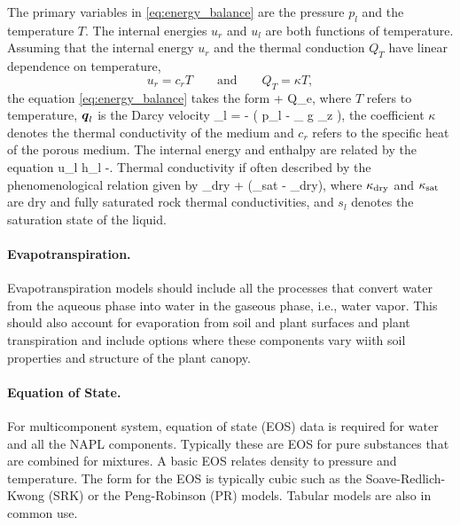 The primary variables in \eqref{eq:energy_balance} are the pressure $p_l$ 
and the temperature $T$. 
The internal energies $u_r$ and $u_l$ are both functions of temperature.  
Assuming that the internal energy $u_r$ and the thermal conduction $Q_T$
have linear dependence on temperature,  
$$
  u_r = c_r T \qquad \text{and}\qquad Q_T=\kappa T,
$$
the equation \eqref{eq:energy_balance} takes the form 
\EQ
  + 
  \boldsymbol{\nabla}\cdot {} 
  \eq 
  Q_e,
\EN
where 
$T$ refers to temperature, 
${\boldsymbol{q}}_l$ is the Darcy velocity 
\EQ
  \bq_l 
  =  
  - 
  \left(
  \boldsymbol{\nabla} p_l 
  -
  \rho _{\alpha} g _z
  \right), 
\EN
the coefficient $\kappa$ denotes the thermal conductivity of the medium and 
$c_r$ refers to the specific heat of the porous medium. 
The internal energy and enthalpy are related by the equation
\EQ
  u_l \eq h_l -.
\EN
Thermal conductivity if often described by the phenomenological relation given by \citet{somerton1974high}
\EQ\label{cond} 
  \kappa \eq \kappa_{\rm dry} +  (\kappa_{\rm sat} - \kappa_{\rm dry}), 
\EN 
where $\kappa_{\rm dry}$ and $\kappa_{\rm sat}$ are dry and fully saturated rock thermal conductivities, 
and $s_l$ denotes the saturation state of the liquid. 

\paragraph{Evapotranspiration. } 
%
Evapotranspiration models should include all the processes that convert water from the aqueous phase into water in the gaseous phase, 
i.e., water vapor.  
This should also account for evaporation from soil and plant surfaces and plant transpiration and include options 
where these components vary wiith soil properties and structure of the plant canopy.

\paragraph{Equation of State.}
%
For multicomponent system, equation of state (EOS) data is required for water and all the NAPL components.  
Typically these are EOS for pure substances that are combined for mixtures.  
A basic EOS relates density to pressure and temperature.  
The form for the EOS is typically cubic such as the Soave-Redlich-Kwong (SRK) or the
Peng-Robinson (PR) models.  
Tabular models are also in common use.

